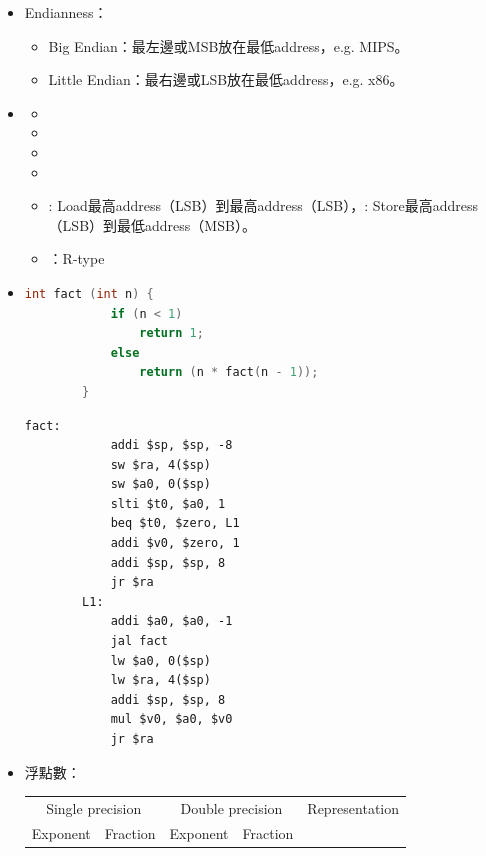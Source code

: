\begin{itemize}
    \item Endianness：\begin{itemize}
        \item Big Endian：最左邊或MSB放在最低address，e.g. MIPS。
        \item Little Endian：最右邊或LSB放在最低address，e.g. x86。
    \end{itemize}
    \item \quad\quad \begin{itemize}
        \item {}
        \item {}
        \item {}
        \item {}
        \item {}: Load最高address（LSB）到最高address（LSB），: Store最高address（LSB）到最低address（MSB）。
        \item {}：R-type
    \end{itemize}
    \item \quad\quad \begin{lstlisting}[language={C}]
        int fact (int n) {
            if (n < 1)
                return 1;
            else
                return (n * fact(n - 1));            
        }
    \end{lstlisting}
    \begin{lstlisting}[language={[x86masm]Assembler}]
        fact:
            addi $sp, $sp, -8
            sw $ra, 4($sp)
            sw $a0, 0($sp)
            slti $t0, $a0, 1
            beq $t0, $zero, L1
            addi $v0, $zero, 1
            addi $sp, $sp, 8
            jr $ra
        L1:
            addi $a0, $a0, -1
            jal fact
            lw $a0, 0($sp)
            lw $ra, 4($sp)
            addi $sp, $sp, 8
            mul $v0, $a0, $v0
            jr $ra
    \end{lstlisting}
    \item 浮點數：
    \begin{table}[H]
        \centering
        \begin{tabular}{|c|c|c|c|c|}
            \hline
            \multicolumn{2}{|c|}{Single precision} & \multicolumn{2}{c|}{Double precision} & Representation \\
            \Xhline{2\arrayrulewidth}
            Exponent & Fraction & Exponent & Fraction & \\

\end{tabular}
\end{table}
\end{itemize}
